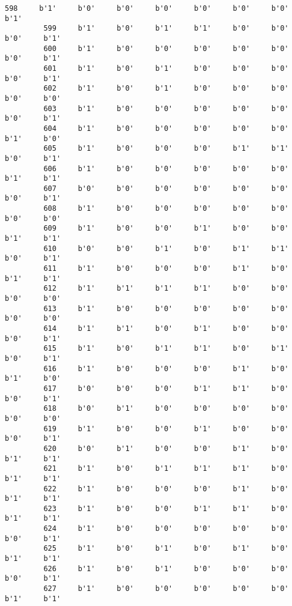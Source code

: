 \documentclass[11pt]{article}
\begin{document}
\begin{Verbatim}[commandchars=\\\{\}]
         598     b'1'     b'0'     b'0'     b'0'     b'0'     b'0'     b'0'     b'1'   
         599     b'1'     b'0'     b'1'     b'1'     b'0'     b'0'     b'0'     b'1'   
         600     b'1'     b'0'     b'0'     b'0'     b'0'     b'0'     b'0'     b'1'   
         601     b'1'     b'0'     b'1'     b'0'     b'0'     b'0'     b'0'     b'1'   
         602     b'1'     b'0'     b'1'     b'0'     b'0'     b'0'     b'0'     b'0'   
         603     b'1'     b'0'     b'0'     b'0'     b'0'     b'0'     b'0'     b'1'   
         604     b'1'     b'0'     b'0'     b'0'     b'0'     b'0'     b'1'     b'0'   
         605     b'1'     b'0'     b'0'     b'0'     b'1'     b'1'     b'0'     b'1'   
         606     b'1'     b'0'     b'0'     b'0'     b'0'     b'0'     b'1'     b'1'   
         607     b'0'     b'0'     b'0'     b'0'     b'0'     b'0'     b'0'     b'1'   
         608     b'1'     b'0'     b'0'     b'0'     b'0'     b'0'     b'0'     b'0'   
         609     b'1'     b'0'     b'0'     b'1'     b'0'     b'0'     b'1'     b'1'   
         610     b'0'     b'0'     b'1'     b'0'     b'1'     b'1'     b'0'     b'1'   
         611     b'1'     b'0'     b'0'     b'0'     b'1'     b'0'     b'1'     b'1'   
         612     b'1'     b'1'     b'1'     b'1'     b'0'     b'0'     b'0'     b'0'   
         613     b'1'     b'0'     b'0'     b'0'     b'0'     b'0'     b'0'     b'0'   
         614     b'1'     b'1'     b'0'     b'1'     b'0'     b'0'     b'0'     b'1'   
         615     b'1'     b'0'     b'1'     b'1'     b'0'     b'1'     b'0'     b'1'   
         616     b'1'     b'0'     b'0'     b'0'     b'1'     b'0'     b'1'     b'0'   
         617     b'0'     b'0'     b'0'     b'1'     b'1'     b'0'     b'0'     b'1'   
         618     b'0'     b'1'     b'0'     b'0'     b'0'     b'0'     b'0'     b'0'   
         619     b'1'     b'0'     b'0'     b'1'     b'0'     b'0'     b'0'     b'1'   
         620     b'0'     b'1'     b'0'     b'0'     b'1'     b'0'     b'1'     b'1'   
         621     b'1'     b'0'     b'1'     b'1'     b'1'     b'0'     b'1'     b'1'   
         622     b'1'     b'0'     b'0'     b'0'     b'1'     b'0'     b'1'     b'1'   
         623     b'1'     b'0'     b'0'     b'1'     b'1'     b'0'     b'1'     b'1'   
         624     b'1'     b'0'     b'0'     b'0'     b'0'     b'0'     b'0'     b'1'   
         625     b'1'     b'0'     b'1'     b'0'     b'1'     b'0'     b'1'     b'1'   
         626     b'1'     b'0'     b'1'     b'0'     b'0'     b'0'     b'0'     b'1'   
         627     b'1'     b'0'     b'0'     b'0'     b'0'     b'0'     b'1'     b'1'   

\end{Verbatim}
\end{document}
